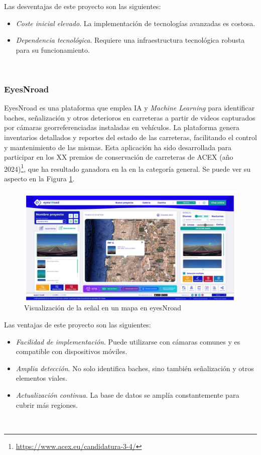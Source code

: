 Las desventajas de este proyecto son las siguientes:
\begin{itemize}
	\item \textit{Coste inicial elevado}. La implementación de tecnologías avanzadas es costosa.
	\item \textit{Dependencia tecnológica}. Requiere una infraestructura tecnológica robusta para su funcionamiento.
\end{itemize}\


\subsubsection{EyesNroad}
\label{subsubsec:sistema3}

EyesNroad es una plataforma que emplea \ac{IA} y \textit{Machine Learning} para identificar baches, señalización y otros deterioros en carreteras a partir de videos capturados por cámaras georreferenciadas instaladas en vehículos. La plataforma genera inventarios detallados y reportes del estado de las carreteras, facilitando el control y mantenimiento de las mismas. Esta aplicación ha sido desarrollada para participar en los XX premios de conservación de carreteras de \ac{ACEX} (año 2024)\footnote{\url{https://www.acex.eu/candidatura-3-4/}}, que ha resultado ganadora en la en la categoría general. Se puede ver su aspecto en la Figura \ref{fig:enr}.

\begin{figure} [h!]
	\begin{center}
		\includegraphics[width=16cm]{figs/enr.png}
	\end{center}
	\caption{Visualización de la señal en un mapa en eyesNroad}
	\label{fig:enr}
\end{figure}


Las ventajas de este proyecto son las siguientes:

\begin{itemize}
	\item \textit{Facilidad de implementación}. Puede utilizarse con cámaras comunes y es compatible con dispositivos móviles.
	\item \textit{Amplia detección}. No solo identifica baches, sino también señalización y otros elementos viales.
	\item \textit{Actualización continua}. La base de datos se amplía constantemente para cubrir más regiones.
	
\end{itemize}\

